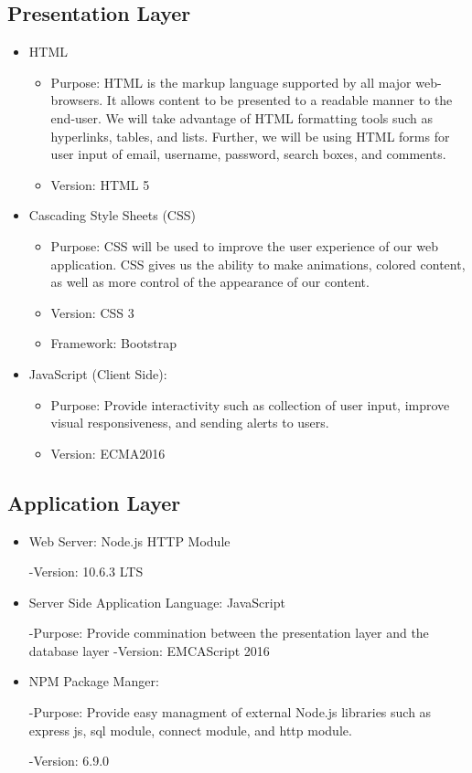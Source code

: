 \documentclass[letter, 12pt, titlepage]{article}
\begin{document}
			\subsection{Presentation Layer}
			\begin{itemize}
			 \item HTML
				\begin{itemize}
					\item Purpose: HTML is the markup language supported by all major web-browsers. It allows content to be presented to a readable manner to the end-user. We will take advantage of HTML formatting tools such as hyperlinks, tables, and lists. Further, we will be using HTML forms for user input of email, username, password, search boxes, and comments.
					\item Version: HTML 5
				\end{itemize}
			\item Cascading Style Sheets (CSS)
			\begin{itemize}	
				\item Purpose: CSS will be used to improve the user experience of our web application. CSS gives us the ability to make animations, colored content, as well as more control of the appearance of our content.
				\item Version: CSS 3
				\item Framework: Bootstrap
			\end{itemize}
			\item	JavaScript (Client Side):
				\begin{itemize}
					\item	Purpose: Provide interactivity such as collection of user input, improve visual responsiveness, and sending alerts to users.
					\item Version: ECMA2016
				\end{itemize}
			\end{itemize}

		\subsection{Application Layer}
		\begin{itemize}
			\item Web Server: Node.js HTTP Module
			
				-Version: 10.6.3 LTS
			
			\item Server Side Application Language: JavaScript
				
				-Purpose: Provide commination between the presentation layer and the database layer
				-Version: EMCAScript 2016

			\item	NPM Package Manger:

				-Purpose: Provide easy managment of external Node.js libraries such as express js, sql module, connect module, and http module.

				-Version: 6.9.0 
		\end{itemize}	
\end{document}
